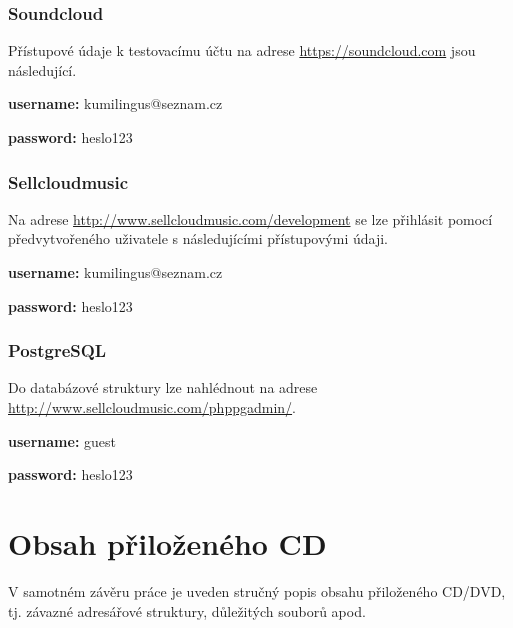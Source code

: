 \documentclass[12pt]{article}
\begin{document}
\subsubsection{Soundcloud}

Přístupové údaje k testovacímu účtu na adrese \url{https://soundcloud.com} jsou následující.

\begin{description}
\item{\textbf{username:}} kumilingus@seznam.cz
\item{\textbf{password:}} heslo123
\end{description}

\subsubsection{Sellcloudmusic}

Na adrese \url{http://www.sellcloudmusic.com/development} se lze přihlásit pomocí předvytvořeného uživatele s následujícími přístupovými údaji.

\begin{description}
\item{\textbf{username:}} kumilingus@seznam.cz
\item{\textbf{password:}} heslo123
\end{description}

\subsubsection{PostgreSQL}

Do databázové struktury lze nahlédnout na adrese\newline
\url{http://www.sellcloudmusic.com/phppgadmin/}.

\begin{description}
\item{\textbf{username:}} guest
\item{\textbf{password:}} heslo123
\end{description}

\newpage
\section{Obsah přiloženého CD} \label{ObsahCD}
V samotném závěru práce je uveden stručný popis obsahu přiloženého
CD/DVD, tj. závazné adresářové struktury, důležitých souborů apod.
\end{document}
